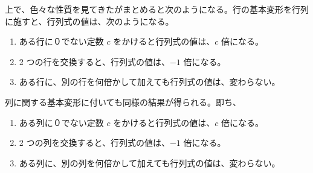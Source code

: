 上で、色々な性質を見てきたがまとめると次のようになる。行の基本変形を行列に施すと、行列式の値は、次のようになる。
\begin{enumerate}
\item ある行に０でない定数 $c$ をかけると行列式の値は、$c$ 倍になる。
\item 2 つの行を交換すると、行列式の値は、$-1$ 倍になる。
\item ある行に、別の行を何倍かして加えても行列式の値は、変わらない。
\end{enumerate}

列に関する基本変形に付いても同様の結果が得られる。即ち、
\begin{enumerate}
\item ある列に０でない定数 $c$ をかけると行列式の値は、$c$ 倍になる。
\item 2 つの列を交換すると、行列式の値は、$-1$ 倍になる。
\item ある列に、別の列を何倍かして加えても行列式の値は、変わらない。
\end{enumerate}

